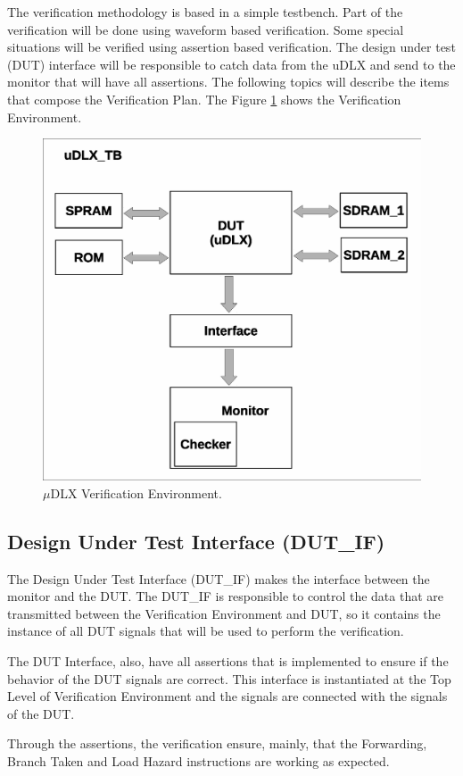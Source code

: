 \documentclass{article}
\begin{document}
	The verification methodology is based in a simple testbench. Part of the verification will be done using waveform based verification. Some special situations will be verified using assertion based verification. The design under test (DUT) interface will be responsible to catch data from the uDLX and send to the monitor that will have all assertions. The following topics will describe the items that compose the Verification Plan. The Figure \ref{fig:ver_env} shows the Verification Environment. 
	
		
	\begin{figure}[H]
    	\centering
    	\includegraphics[width=.7\linewidth]{pictures/verification_environment_v2.eps}
    	\caption{$\mu$DLX Verification Environment.}
    	\label{fig:ver_env}
  	\end{figure} 
	
	\subsection{Design Under Test Interface (DUT\_IF)}
	
	The Design Under Test Interface (DUT\_IF) makes the interface between the monitor and the DUT. The DUT\_IF is responsible to control the data that are transmitted between the Verification Environment and DUT, so it contains the instance of all DUT signals that will be used to perform the verification.
	
The DUT Interface, also, have all assertions that is implemented to ensure if the behavior of the DUT signals are correct. 
This interface is instantiated at the Top Level of Verification Environment and the signals are connected with the signals of the DUT.

Through the assertions, the verification ensure, mainly, that the Forwarding, Branch Taken and Load Hazard instructions are working as expected.
\end{document}
